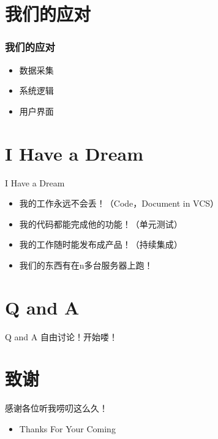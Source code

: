 \documentclass{beamer}
\begin{document}
\section{我们的应对}
\begin{frame}
    \frametitle{我们的应对}
    \begin{itemize}
        \item 数据采集
        \item 系统逻辑
        \item 用户界面
    \end{itemize}
\end{frame}

\section{I Have a Dream} 
\begin{frame}{I Have a Dream}
\begin{itemize}
    \item 我的工作永远不会丢！（Code，Document in VCS）
    \item 我的代码都能完成他的功能！（单元测试）
    \item 我的工作随时能发布成产品！（持续集成）
    \item 我们的东西有在n多台服务器上跑！
\end{itemize}
\end{frame}

\section{Q and A}
\begin{frame}{Q and A }
    自由讨论！开始喽！
\end{frame}


\section{ 致谢 }
\begin{frame}{  感谢各位听我唠叨这么久！ }
 \begin{itemize}
    \item Thanks For Your Coming 
 \end{itemize}
\end{frame}
\end{document}
